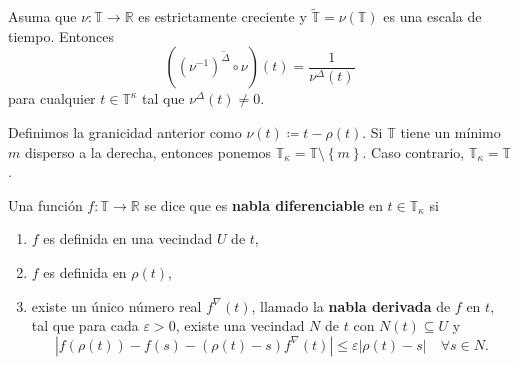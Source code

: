 \begin{frame}

\begin{theorem}
	Asuma que $\nu\colon\mathds{T}\rightarrow\mathds{R}$ es estrictamente creciente y $\tilde{\mathds{T}}=\nu\left(\mathds{T}\right)$ es una escala de tiempo. Entonces \[ 	\left({\left(\nu^{-1}\right)}^{\tilde{\Delta}}\circ\nu\right)\left(t\right)=\frac{1}{\nu^{\Delta}\left(t\right)} \] para cualquier $t\in\mathds{T}^{\kappa}$ tal que $\nu^{\Delta}\left(t\right)\neq0$.
\end{theorem}

\begin{definition}
	Definimos la granicidad anterior como $\nu\left(t\right)\coloneqq t-\rho\left(t\right)$. Si $\mathds{T}$ tiene un mínimo $m$ disperso a la derecha, entonces ponemos $\mathds{T}_{\kappa}=\mathds{T}\setminus\left\{m\right\}$. Caso contrario, $\mathds{T}_{\kappa}=\mathds{T}$.
\end{definition}

\begin{definition}
	Una función $f\colon\mathds{T}\rightarrow\mathds{R}$ se dice que es \textbf{nabla diferenciable} en $t\in\mathds{T}_{\kappa}$ si
	\begin{enumerate}
		\item $f$ es definida en una vecindad $U$ de $t$,
		\item $f$ es definida en $\rho\left(t\right)$,
		\item existe un único número real $f^{\nabla}\left(t\right)$, llamado la \textbf{nabla derivada} de $f$ en $t$, tal que para cada $\varepsilon>0$, existe una vecindad $N$ de $t$ con $N\left(t\right)\subseteq U$ y \[ \left|f\left(\rho\left(t\right)\right)-f\left(s\right)-\left(\rho\left(t\right)-s\right)f^{\nabla}\left(t\right)\right|\leq\varepsilon\left|\rho\left(t\right)-s\right|\quad\forall s\in N. \]
	\end{enumerate}
\end{definition}

\end{frame}

